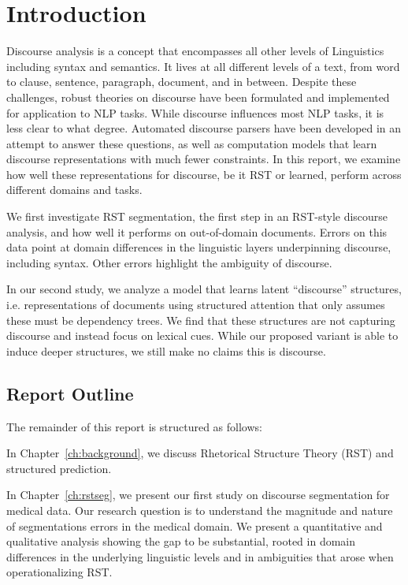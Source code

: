 \chapter{Introduction}
\label{ch:intro}

Discourse analysis is a concept that encompasses all other levels of Linguistics including syntax and semantics. It lives at all different levels of a text, from word to clause, sentence, paragraph, document, and in between. Despite these challenges, robust theories on discourse have been formulated and implemented for application to NLP tasks. While discourse influences most NLP tasks, it is less clear to what degree. Automated discourse parsers have been developed in an attempt to answer these questions, as well as computation models that learn discourse representations with much fewer constraints. In this report, we examine how well these representations for discourse, be it RST or learned, perform across different domains and tasks.

We first investigate RST segmentation, the first step in an RST-style discourse analysis, and how well it performs on out-of-domain documents. Errors on this data point at domain differences in the linguistic layers underpinning discourse, including syntax. Other errors highlight the ambiguity of discourse. 

In our second study, we analyze a model that learns latent ``discourse'' structures, i.e. representations of documents using structured attention that only assumes these must be dependency trees. We find that these structures are not capturing discourse and instead focus on lexical cues. While our proposed variant is able to induce deeper structures, we still make no claims this is discourse. 

\section{Report Outline}

The remainder of this report is structured as follows:

In Chapter~\ref{ch:background}, we discuss Rhetorical Structure Theory (RST) and structured prediction. 

In Chapter~\ref{ch:rstseg}, we present our first study on discourse segmentation for medical data. Our research question is to understand the magnitude and nature of segmentations errors in the medical domain. We present a quantitative and qualitative analysis showing the gap to be substantial, rooted in domain differences in the underlying linguistic levels and in ambiguities that arose when operationalizing RST.

